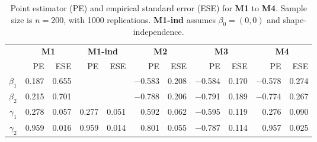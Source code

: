 \documentclass[a4paper,10pt]{article}
\begin{document}
\begin{table}[ht]
\centering
\caption{Point estimator (PE) and empirical standard error (ESE) for \textbf{M1} to \textbf{M4}.
Sample size is $n = 200$, with 1000 replications.
\textbf{M1-ind} assumes $\beta_0 = (0, 0)$ and shape-independence.}
\begin{tabular}{rrrrrrrrrrr}
\toprule
& \multicolumn{2}{c}{\textbf{M1}}
& \multicolumn{2}{c}{\textbf{M1-ind}}
& \multicolumn{2}{c}{\textbf{M2}}
& \multicolumn{2}{c}{\textbf{M3}}
& \multicolumn{2}{c}{\textbf{M4}}\\
\cmidrule(l){2-3}\cmidrule(l){4-5}\cmidrule(l){6-7}\cmidrule(l){8-9}\cmidrule(l){10-11}
& PE & ESE & PE & ESE & PE & ESE & PE & ESE & PE & ESE \\
\midrule
\textbf{$\beta_1$} & 0.187 & 0.655 & & & $-$0.583 & 0.208 & $-$0.584 & 0.170 & $-$0.578 & 0.274 \\ 
\textbf{$\beta_2$} & 0.215 & 0.701 & & & $-$0.788 & 0.206 & $-$0.791 & 0.189 & $-$0.774 & 0.267 \\ 
\textbf{$\gamma_1$} & 0.278 & 0.057 & 0.277 & 0.051 & 0.592 & 0.062 & $-$0.595 & 0.119 & 0.276 & 0.090 \\ 
\textbf{$\gamma_2$} & 0.959 & 0.016 & 0.959 & 0.014 & 0.801 & 0.055 & $-$0.787 & 0.114 & 0.957 & 0.025 \\ 
\bottomrule
\end{tabular}
\end{table}

\end{document}
